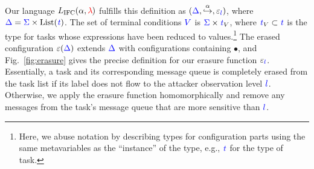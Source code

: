 \documentclass{llncs}
\newcommand{\Varid}[1]{\mathit{#1}}
\newcommand{\Red}[1]{{\color{red} #1}}
\begin{document}
Our language \ensuremath{L_\text{IFC}(\alpha,\Red{\lambda}\;\!\!)} fulfills
this definition as \ensuremath{(\ifc{\Delta},\overset{\alpha}{\hookrightarrow},\varepsilon_{\ifc{l}})}, where
$\ensuremath{\ifc{\Delta}} = \ensuremath{\ifc{\Sigma}} \times \operatorname{List}(\ensuremath{\ifc{\Varid{t}}})$.  The set of terminal conditions
${\color{blue} V}$ is $\ensuremath{\ifc{\Sigma}} \times \ensuremath{\ifc{\Varid{t}}}_V$, where $\ensuremath{\ifc{\Varid{t}}}_V \subset \ensuremath{\ifc{\Varid{t}}}$ is the
type for tasks whose expressions have been reduced to
values.\footnote{
  Here, we abuse notation by describing types for configuration parts using the
  same metavariables as the ``instance'' of the type, e.g., \ensuremath{\ifc{\Varid{t}}} for the type of
  task.
}
The erased configuration \ensuremath{\varepsilon(\ifc{\Delta})} extends \ensuremath{\ifc{\Delta}} with configurations
containing \ensuremath{\bullet}, and Fig.~\ref{fig:erasure} gives the precise definition for
our erasure function \ensuremath{\varepsilon_{\ifc{l}}}.
Essentially, a task and its corresponding message queue is completely erased from the task
list if its label does not flow to the attacker observation level \ensuremath{\ifc{l}}.
Otherwise, we apply the erasure function homomorphically and remove any messages
from the task's message queue that are more sensitive than \ensuremath{\ifc{l}}.
\end{document}
